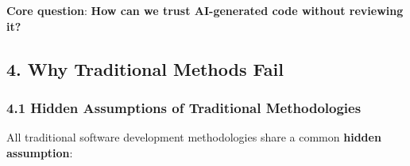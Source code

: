 \documentclass[
]{article}
\begin{document}
\textbf{Core question}: \textbf{How can we trust AI-generated code
without reviewing it?}

\hypertarget{4-why-traditional-methods-fail}{%
\subsection{4. Why Traditional Methods
Fail}\label{4-why-traditional-methods-fail}}

\hypertarget{41-hidden-assumptions-of-traditional-methodologies}{%
\subsubsection{4.1 Hidden Assumptions of Traditional
Methodologies}\label{41-hidden-assumptions-of-traditional-methodologies}}

All traditional software development methodologies share a common
\textbf{hidden assumption}:
\end{document}
